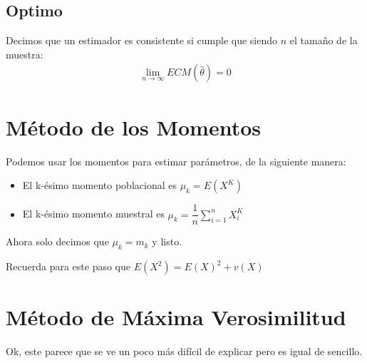 \documentclass[12pt, fleqn]{report}                             %
\theoremstyle{break}                                            %
\begin{document}
            \subsection{Optimo}

                Decimos que un estimador es consistente si cumple que siendo
                $n$ el tamaño de la muestra:
                \begin{align*}
                    \lim_{n \to \infty} ECM(\hat \theta) = 0 
                \end{align*}



        \clearpage
        \section{Método de los Momentos}  

            Podemos usar los momentos para estimar parámetros, de la siguiente manera:
            \begin{itemize}
                \item El k-ésimo momento poblacional es $\mu_k = E(X^K)$
                \item El k-ésimo momento muestral es 
                    $\mu_k = \dfrac{1}{n} \sum_{i=1}^n X_i^K$
            \end{itemize}

            Ahora solo decimos que $\mu_k = m_k$ y listo.


            Recuerda para este paso que $E(X^2) = E(X)^2 + v(X)$



        \clearpage
        \section{Método de Máxima Verosimilitud}

            Ok, este parece que se ve un poco más difícil de explicar pero
            es igual de sencillo.
\end{document}
